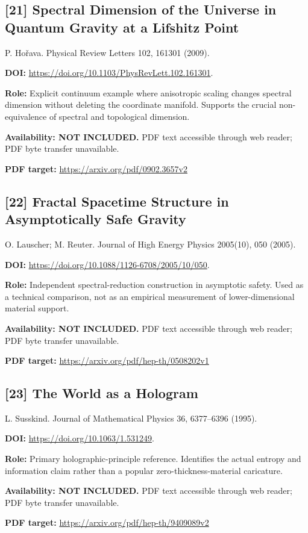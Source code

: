 \documentclass[11pt,a4paper]{article}
\begin{document}
\begin{minipage}{\textwidth}
\subsection*{[21] Spectral Dimension of the Universe in Quantum Gravity at a Lifshitz Point}
P. Ho\v rava. Physical Review Letters 102, 161301 (2009).

\textbf{DOI:} \url{https://doi.org/10.1103/PhysRevLett.102.161301}.

\textbf{Role:} Explicit continuum example where anisotropic scaling changes spectral dimension without deleting the coordinate manifold. Supports the crucial non-equivalence of spectral and topological dimension.

\textbf{Availability: NOT INCLUDED.} PDF text accessible through web reader; PDF byte transfer unavailable.\par
\textbf{PDF target:} \url{https://arxiv.org/pdf/0902.3657v2}
\end{minipage}
\par\medskip
\begin{minipage}{\textwidth}
\subsection*{[22] Fractal Spacetime Structure in Asymptotically Safe Gravity}
O. Lauscher; M. Reuter. Journal of High Energy Physics 2005(10), 050 (2005).

\textbf{DOI:} \url{https://doi.org/10.1088/1126-6708/2005/10/050}.

\textbf{Role:} Independent spectral-reduction construction in asymptotic safety. Used as a technical comparison, not as an empirical measurement of lower-dimensional material support.

\textbf{Availability: NOT INCLUDED.} PDF text accessible through web reader; PDF byte transfer unavailable.\par
\textbf{PDF target:} \url{https://arxiv.org/pdf/hep-th/0508202v1}
\end{minipage}
\par\medskip
\begin{minipage}{\textwidth}
\subsection*{[23] The World as a Hologram}
L. Susskind. Journal of Mathematical Physics 36, 6377--6396 (1995).

\textbf{DOI:} \url{https://doi.org/10.1063/1.531249}.

\textbf{Role:} Primary holographic-principle reference. Identifies the actual entropy and information claim rather than a popular zero-thickness-material caricature.

\textbf{Availability: NOT INCLUDED.} PDF text accessible through web reader; PDF byte transfer unavailable.\par
\textbf{PDF target:} \url{https://arxiv.org/pdf/hep-th/9409089v2}
\end{minipage}
\end{document}
